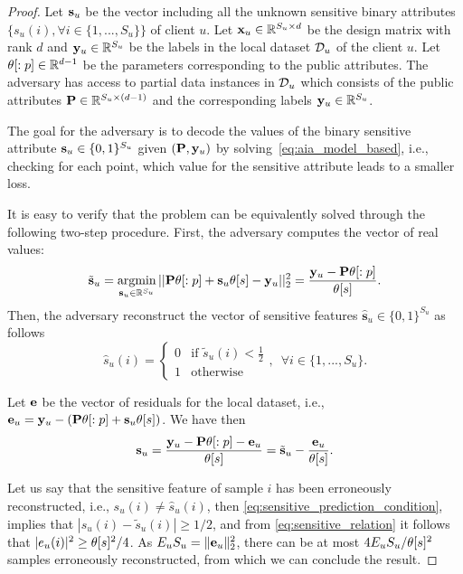 \begin{proof}
Let $\mathbf{s}_u $ be the vector including all the unknown sensitive binary attributes $\{s_u(i), \forall i\in \{1, ..., S_u\}\}$ of client $u$.
Let ${\mathbf{x}}_u\in \mathbb{R}^{S_u\times d}$ be the design matrix with rank $d$ and $\mathbf{y}_u\in \mathbb{R}^{S_u}$ be the labels in the local dataset $\mathcal{D}_u$ of the client $u$.  Let $\theta[:p]\in \mathbb{R}^{d-1}$ be the parameters corresponding to the public attributes. 
The adversary has access to partial data instances in $\mathcal{D}_u$ which consists of the public attributes $\mathbf{P}\in \mathbb{R}^{S_u\times(d-1)}$ and the corresponding labels $\mathbf{y}_u\in \mathbb{R}^{S_u}$. 

The goal for the adversary is to decode the values of the binary sensitive attribute $\mathbf{s}_u \in\{0,1\}^{S_u}$ given $(\mathbf{P}, \mathbf{y}_u)$ by solving~\eqref{eq:aia_model_based}, i.e., checking for each point, which value for the sensitive attribute leads to a smaller loss.

It is easy to verify that the problem can be equivalently solved through the following two-step procedure.
First, the adversary computes the vector of real values:
$$
\tilde{\mathbf{s}}_u = \operatorname*{argmin}_{\mathbf{s}_u\in \mathbb{R}^{S_u}} ||\mathbf{P}\theta[:p]+ \mathbf{s}_u\theta[s] - \mathbf{y}_u ||_2^2 = \frac{\mathbf{y}_u-\mathbf{P}\theta[:p]}{\theta[s]}.  
$$
Then, the adversary reconstruct the vector of sensitive features $\hat{\mathbf{s}}_u \in \{0,1\}^{S_u}$ as follows
\begin{equation}\label{eq:sensitive_prediction_condition}
\hat s_u(i) = 
\begin{cases}
    0& \text{if } \tilde{{s}}_u(i) <\frac{1}{2}\\
    1              & \text{otherwise}
\end{cases}
,\,\,\,\forall i\in \{1, ..., S_u\}. 
\end{equation}

Let $\mathbf{e}$ be the vector of residuals for the local dataset, i.e., $\mathbf{e}_u = \mathbf{y}_u - (\mathbf{P}\theta[:p]+ \mathbf{s}_u\theta[s])$. We have then 
\begin{equation}\label{eq:sensitive_relation}
    \mathbf{s}_u = \frac{\mathbf{y}_u - \mathbf{P} \theta[:p] - \mathbf{e}_u}{\theta[s]} = \tilde{\mathbf{s}}_u - \frac{\mathbf{e}_u}{\theta[s]}. 
\end{equation}

Let us say that the sensitive feature of sample $i$ has been erroneously reconstructed, i.e., $s_u(i) \neq \hat s_u(i)$, then  \eqref{eq:sensitive_prediction_condition}, implies that $|s_u(i) - \tilde s_u(i)|\ge 1/2$, and from
 \eqref{eq:sensitive_relation} it follows that $|e_u(i)|^2 \ge \theta[s]^2/4$. As $E_u S_u= \lVert \mathbf{e}_u \rVert_2^2$, there can be at most $4 E_u S_u/\theta[s]^2$ samples erroneously reconstructed, from which we can conclude the result.
 \end{proof}

